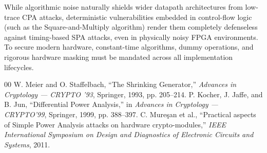 \documentclass[conference, a4paper]{IEEEtran}
\begin{document}
While algorithmic noise naturally shields wider datapath architectures from low-trace CPA attacks, deterministic vulnerabilities embedded in control-flow logic (such as the Square-and-Multiply algorithm) render them completely defenseless against timing-based SPA attacks, even in physically noisy FPGA environments. To secure modern hardware, constant-time algorithms, dummy operations, and rigorous hardware masking must be mandated across all implementation lifecycles.

\begin{thebibliography}{00}
 W. Meier and O. Staffelbach, ``The Shrinking Generator,'' \emph{Advances in Cryptology — CRYPTO '93}, Springer, 1993, pp. 205--214.
 P. Kocher, J. Jaffe, and B. Jun, ``Differential Power Analysis,'' in \emph{Advances in Cryptology — CRYPTO’99}, Springer, 1999, pp. 388--397.
 C. Mureşan et al., ``Practical aspects of Simple Power Analysis attacks on hardware crypto-modules,'' \emph{IEEE International Symposium on Design and Diagnostics of Electronic Circuits and Systems}, 2011.
\end{thebibliography}
\end{document}

